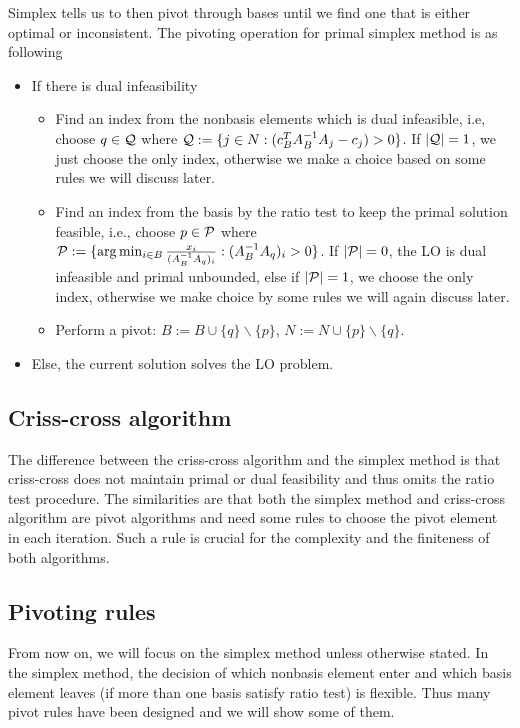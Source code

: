 \documentclass[11pt]{article}
\begin{document}
Simplex tells us to then pivot through bases until we find one that is either optimal or inconsistent. The pivoting operation for primal simplex method is as following
\begin{itemize}
	\item If there is dual infeasibility
	\begin{itemize}
		\item Find an index from the nonbasis elements which is dual infeasible, i.e, choose $q \in {\cal Q}$ where ${\cal Q}
		:= \{j \in N: (c_B^T A_B^{-1} A_j -c_j) > 0\}$. If $|{\cal Q}| = 1$, we just choose the only index, otherwise we make a choice based on some rules we will discuss later. 
		\item Find an index from the basis by the ratio test to keep the primal solution feasible, i.e., choose $p \in {\cal P}$ where ${\cal P}:=\{\arg \min_{i \in B} \frac{x_i}{(A_B^{-1}A_q)_{i}}: (A_B^{-1}A_q)_{i} >0 \}$.  If $|{\cal P}| = 0$, the LO is dual infeasible and primal unbounded, else if $|{\cal P}| = 1$, we choose the only index, otherwise we make choice by some rules we will again discuss later. 
		\item Perform a pivot: $B:= B \cup \{q\} \backslash \{p\}$, $N:= N \cup \{p\} \backslash \{q\}$.
	\end{itemize}
	\item Else, the current solution solves the LO problem.
\end{itemize} 
\subsection{Criss-cross algorithm}
The difference between the criss-cross algorithm and the simplex method is that criss-cross does not maintain primal or dual feasibility and thus omits the ratio test procedure. The similarities are that both the simplex method and criss-cross algorithm are pivot algorithms and need some rules to choose the pivot element in each iteration. Such a rule is crucial for the complexity and the finiteness of both algorithms. 
 
\subsection{Pivoting rules} \label{secpivotrules}
From now on, we will focus on the simplex method unless otherwise stated. In the simplex method, the decision of which nonbasis element enter and which basis element leaves (if more than one basis satisfy ratio test) is flexible. Thus many pivot rules have been designed and we will show some of them. 
\end{document}
